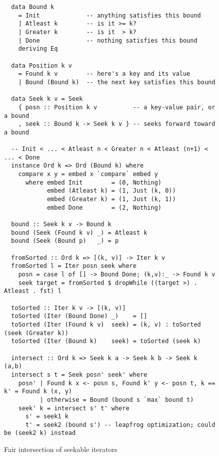 \documentclass[acmsmall,screen,review,anonymous,dvipsnames]{acmart}
\begin{document}
\begin{figure}
  \begin{verbatim}
  data Bound k
    = Init             -- anything satisfies this bound
    | Atleast k        -- is it >= k?
    | Greater k        -- is it  > k?
    | Done             -- nothing satisfies this bound
    deriving Eq

  data Position k v
    = Found k v        -- here's a key and its value
    | Bound (Bound k)  -- the next key satisfies this bound

  data Seek k v = Seek
    { posn :: Position k v          -- a key-value pair, or a bound
    , seek :: Bound k -> Seek k v } -- seeks forward toward a bound

  -- Init < ... < Atleast n < Greater n < Atleast (n+1) < ... < Done
  instance Ord k => Ord (Bound k) where
    compare x y = embed x `compare` embed y
      where embed Init        = (0, Nothing)
            embed (Atleast k) = (1, Just (k, 0))
            embed (Greater k) = (1, Just (k, 1))
            embed Done        = (2, Nothing)

  bound :: Seek k v -> Bound k
  bound (Seek (Found k v) _) = Atleast k
  bound (Seek (Bound p)   _) = p

  fromSorted :: Ord k => [(k, v)] -> Iter k v
  fromSorted l = Iter posn seek where
    posn = case l of [] -> Bound Done; (k,v):_ -> Found k v
    seek target = fromSorted $ dropWhile ((target >) . Atleast . fst) l

  toSorted :: Iter k v -> [(k, v)]
  toSorted (Iter (Bound Done) _)    = []
  toSorted (Iter (Found k v)  seek) = (k, v) : toSorted (seek (Greater k))
  toSorted (Iter (Bound k)    seek) = toSorted (seek k)

  intersect :: Ord k => Seek k a -> Seek k b -> Seek k (a,b)
  intersect s t = Seek posn' seek' where
    posn' | Found k x <- posn s, Found k' y <- posn t, k == k' = Found k (x, y)
          | otherwise = Bound (bound s `max` bound t)
    seek' k = intersect s' t' where
      s' = seek1 k
      t' = seek2 (bound s') -- leapfrog optimization; could be (seek2 k) instead
  \end{verbatim}
  \caption{Fair intersection of seekable iterators}
  \label{fig:fair-iterators}
\end{figure}



\end{document}
